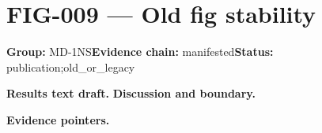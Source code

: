 \clearpage
\section{FIG-009 --- Old fig stability}
\label{figpage:fig-009}
\textbf{Group:} MD-1NS\quad \textbf{Evidence chain:} manifested\quad \textbf{Status:} publication;old\_or\_legacy

\textbf{Results text draft.} 
\textbf{Discussion and boundary.} 


\textbf{Evidence pointers.}



\vfill
